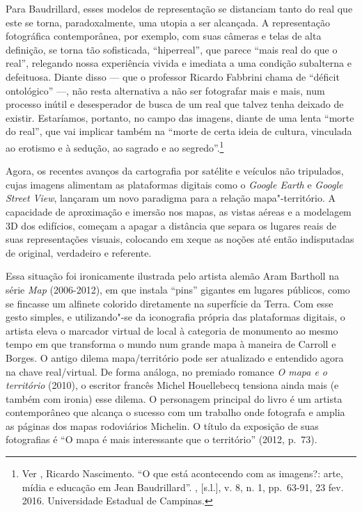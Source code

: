 Para Baudrillard, esses modelos de representação se distanciam tanto do
real que este se torna, paradoxalmente, uma utopia a ser alcançada. A
representação fotográfica contemporânea, por exemplo, com suas câmeras e
telas de alta definição, se torna tão sofisticada, ``hiperreal'', que
parece ``mais real do que o real'', relegando nossa experiência vivida e
imediata a uma condição subalterna e defeituosa. Diante disso --- que o
professor Ricardo Fabbrini chama de ``déficit ontológico'' ---, não resta
alternativa a não ser fotografar mais e mais, num processo inútil e
desesperador de busca de um real que talvez tenha deixado de existir.
Estaríamos, portanto, no campo das imagens, diante de uma lenta ``morte
do real'', que vai implicar também na ``morte de certa ideia de cultura,
vinculada ao erotismo e à sedução, ao sagrado e ao segredo''.\footnote{Ver
  , Ricardo Nascimento. ``O que está acontecendo com as
  imagens?: arte, mídia e educação em Jean
  Baudrillard''. {}, {[}s.l.{]}, v. 8, n. 1,
  pp.~63-91, 23 fev. 2016. Universidade Estadual de Campinas.}

Agora, os recentes avanços da cartografia por satélite e veículos não
tripulados, cujas imagens alimentam as plataformas digitais como o
\emph{Google Earth} e \emph{Google Street View}, lançaram um novo
paradigma para a relação mapa"-território. A capacidade de aproximação e
imersão nos mapas, as vistas aéreas e a modelagem 3D dos edifícios,
começam a apagar a distância que separa os lugares reais de suas
representações visuais, colocando em xeque as noções até então
indisputadas de original, verdadeiro e referente.

Essa situação foi ironicamente ilustrada pelo artista alemão Aram
Bartholl na série \emph{Map} (2006-2012), em que instala ``pins''
gigantes em lugares públicos, como se fincasse um alfinete colorido
diretamente na superfície da Terra. Com esse gesto simples, e
utilizando"-se da iconografia própria das plataformas digitais, o artista
eleva o marcador virtual de local à categoria de monumento ao mesmo
tempo em que transforma o mundo num grande mapa à maneira de Carroll e
Borges. O antigo dilema mapa/território pode ser atualizado e entendido
agora na chave real/virtual. De forma análoga, no premiado romance
\emph{O mapa e o território} (2010), o escritor francês Michel
Houellebecq tensiona ainda mais (e também com ironia) esse dilema. O
personagem principal do livro é um artista contemporâneo que alcança o
sucesso com um trabalho onde fotografa e amplia as páginas dos mapas
rodoviários Michelin. O título da exposição de suas fotografias é ``O
mapa é mais interessante que o território'' (2012, p.~73).

